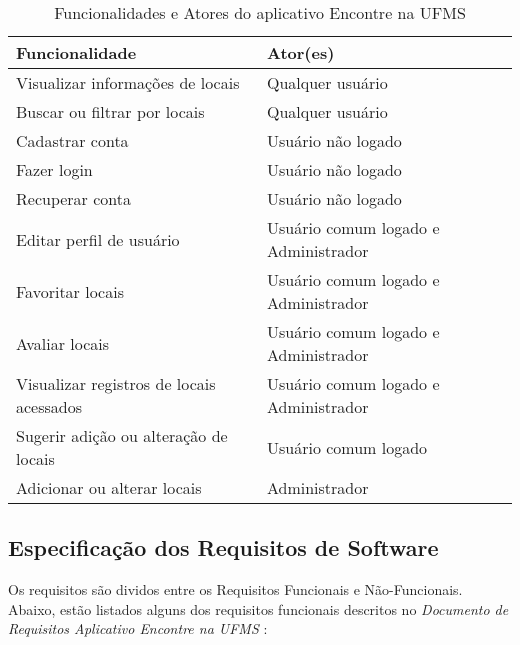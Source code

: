    \begin{table}[h]
        \begin{tabularx}{\textwidth}{|X|X|}
            \hline
            \textbf{Funcionalidade} & \textbf{Ator(es)} \\ \hline
            Visualizar informações de locais & Qualquer usuário \\ \hline
            Buscar ou filtrar por locais & Qualquer usuário \\ \hline
            Cadastrar conta & Usuário não logado \\ \hline
            Fazer login & Usuário não logado \\ \hline
            Recuperar conta & Usuário não logado \\ \hline
            Editar perfil de usuário & Usuário comum logado e Administrador \\ \hline
            Favoritar locais & Usuário comum logado e Administrador \\ \hline
            Avaliar locais & Usuário comum logado e Administrador \\ \hline
            Visualizar registros de locais acessados & Usuário comum logado e Administrador \\ \hline
            Sugerir adição ou alteração de locais & Usuário comum logado \\ \hline
            Adicionar ou alterar locais & Administrador \\ \hline
        \end{tabularx}
        \caption{Funcionalidades e Atores do aplicativo Encontre na UFMS}
        \label{tab:funcionalidades-atores}
    \end{table}
    \FloatBarrier
\subsection{Especificação dos Requisitos de Software}

    Os requisitos são dividos entre os Requisitos Funcionais e Não-Funcionais. Abaixo, estão listados alguns dos requisitos funcionais descritos no \textit{Documento de Requisitos Aplicativo Encontre na UFMS} \cite{documentoRequisitosAplicativoEncontreNaUFMS}:
    
